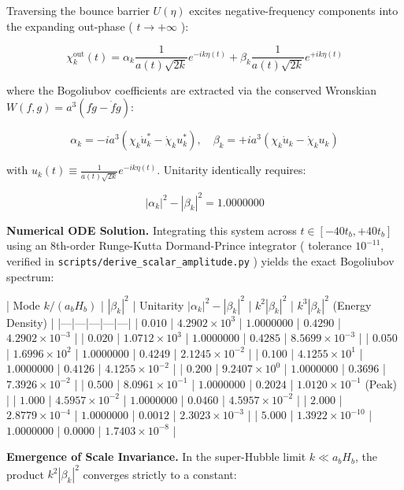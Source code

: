 \documentclass[11pt,a4paper]{article}
\theoremstyle{definition}
\theoremstyle{remark}
\begin{document}
Traversing the bounce barrier $U(\eta)$ excites negative-frequency components into the expanding out-phase ( $t \to +\infty$ ):


\begin{equation}
\chi_k^{\text{out}}(t) = \alpha_k \frac{1}{a(t)\sqrt{2k}} e^{-i k \eta(t)} + \beta_k \frac{1}{a(t)\sqrt{2k}} e^{+i k \eta(t)}
\end{equation}


where the Bogoliubov coefficients are extracted via the conserved Wronskian $W(f, g) = a^3(f\dot{g} - \dot{f}g)$:


\begin{equation}
\alpha_k = -i a^3 \left( \chi_k \dot{u}_k^* - \dot{\chi}_k u_k^* \right), \quad \beta_k = +i a^3 \left( \chi_k \dot{u}_k - \dot{\chi}_k u_k \right)
\end{equation}


with $u_k(t) \equiv \frac{1}{a(t)\sqrt{2k}} e^{-ik\eta(t)}$. Unitarity identically requires:


\begin{equation}
|\alpha_k|^2 - |\beta_k|^2 = 1.0000000
\end{equation}


\textbf{Numerical ODE Solution.} Integrating this system across $t \in [-40 t_b, +40 t_b]$ using an 8th-order Runge-Kutta Dormand-Prince integrator ( tolerance $10^{-11}$, verified in \texttt{scripts/derive_scalar_amplitude.py} ) yields the exact Bogoliubov spectrum:

| Mode $k / (a_b H_b)$ | $|\beta_k|^2$ | Unitarity $|\alpha_k|^2 - |\beta_k|^2$ | $k^2 |\beta_k|^2$ | $k^3 |\beta_k|^2$ (Energy Density) |
|---|---|---|---|---|
| $0.010$ | $4.2902 \times 10^3$ | $1.0000000$ | $0.4290$ | $4.2902 \times 10^{-3}$ |
| $0.020$ | $1.0712 \times 10^3$ | $1.0000000$ | $0.4285$ | $8.5699 \times 10^{-3}$ |
| $0.050$ | $1.6996 \times 10^2$ | $1.0000000$ | $0.4249$ | $2.1245 \times 10^{-2}$ |
| $0.100$ | $4.1255 \times 10^1$ | $1.0000000$ | $0.4126$ | $4.1255 \times 10^{-2}$ |
| $0.200$ | $9.2407 \times 10^0$ | $1.0000000$ | $0.3696$ | $7.3926 \times 10^{-2}$ |
| $0.500$ | $8.0961 \times 10^{-1}$ | $1.0000000$ | $0.2024$ | $1.0120 \times 10^{-1}$ (Peak) |
| $1.000$ | $4.5957 \times 10^{-2}$ | $1.0000000$ | $0.0460$ | $4.5957 \times 10^{-2}$ |
| $2.000$ | $2.8779 \times 10^{-4}$ | $1.0000000$ | $0.0012$ | $2.3023 \times 10^{-3}$ |
| $5.000$ | $1.3922 \times 10^{-10}$ | $1.0000000$ | $0.0000$ | $1.7403 \times 10^{-8}$ |

\textbf{Emergence of Scale Invariance.} In the super-Hubble limit $k \ll a_b H_b$, the product $k^2 |\beta_k|^2$ converges strictly to a constant:
\end{document}
